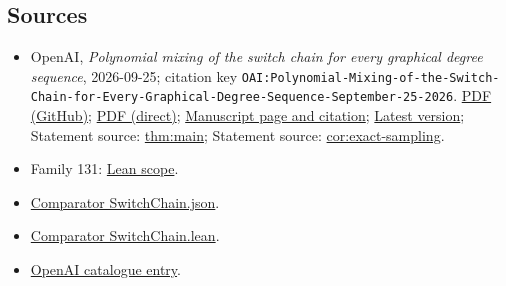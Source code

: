\documentclass[11pt]{article}
\begin{document}
\subsection{Sources}
\begin{itemize}
\item OpenAI, \emph{Polynomial mixing of the switch chain for every graphical degree sequence}, 2026-09-25; citation key \texttt{OAI:Polynomial-Mixing-of-the-Switch-Chain-for-Every-Graphical-Degree-Sequence-September-25-2026}. \href{https://github.com/openai/math/blob/adc7f1241b42e322a6451854ab7e4b4c146bf78a/preprints/Polynomial-Mixing-of-the-Switch-Chain-for-Every-Graphical-Degree-Sequence-September-25-2026/main.pdf}{PDF (GitHub)}; \href{https://github.com/openai/math/raw/adc7f1241b42e322a6451854ab7e4b4c146bf78a/preprints/Polynomial-Mixing-of-the-Switch-Chain-for-Every-Graphical-Degree-Sequence-September-25-2026/main.pdf}{PDF (direct)}; \href{https://github.com/openai/math/blob/adc7f1241b42e322a6451854ab7e4b4c146bf78a/preprints/Polynomial-Mixing-of-the-Switch-Chain-for-Every-Graphical-Degree-Sequence-September-25-2026/README.md}{Manuscript page and citation}; \href{https://github.com/openai/math/blob/main/preprints/Polynomial-Mixing-of-the-Switch-Chain-for-Every-Graphical-Degree-Sequence-September-25-2026/main.pdf}{Latest version}; Statement source: \href{https://github.com/openai/math/blob/adc7f1241b42e322a6451854ab7e4b4c146bf78a/preprints/Polynomial-Mixing-of-the-Switch-Chain-for-Every-Graphical-Degree-Sequence-September-25-2026/build/sections/introduction.tex\#L32}{thm:main}; Statement source: \href{https://github.com/openai/math/blob/adc7f1241b42e322a6451854ab7e4b4c146bf78a/preprints/Polynomial-Mixing-of-the-Switch-Chain-for-Every-Graphical-Degree-Sequence-September-25-2026/build/sections/introduction.tex\#L42}{cor:exact-sampling}.
\item Family 131: \href{https://github.com/openai/math/blob/adc7f1241b42e322a6451854ab7e4b4c146bf78a/lean/docs/131.md}{Lean scope}.
\item \href{https://github.com/openai/math/blob/adc7f1241b42e322a6451854ab7e4b4c146bf78a/lean/ComparatorChallenges/SwitchChain.json}{Comparator SwitchChain.json}.
\item \href{https://github.com/openai/math/blob/adc7f1241b42e322a6451854ab7e4b4c146bf78a/lean/ComparatorChallenges/SwitchChain.lean}{Comparator SwitchChain.lean}.
\item \href{https://github.com/openai/math/blob/adc7f1241b42e322a6451854ab7e4b4c146bf78a/CONTENTS.md}{OpenAI catalogue entry}.
\end{itemize}
\end{document}
